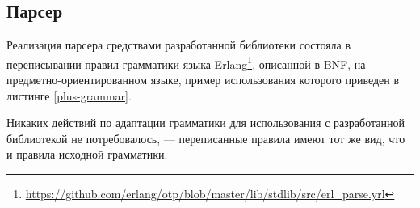 \subsection{Парсер}

Реализация парсера средствами разработанной библиотеки состояла в переписывании правил грамматики языка Erlang\footnote{\url{https://github.com/erlang/otp/blob/master/lib/stdlib/src/erl\_parse.yrl}}, описанной в BNF, на предметно-ориентированном языке, пример использования которого приведен в листинге \ref{plus-grammar}.

Никаких действий по адаптации грамматики для использования с разработанной библиотекой не потребовалось, --- переписанные правила имеют тот же вид, что и правила исходной грамматики.

